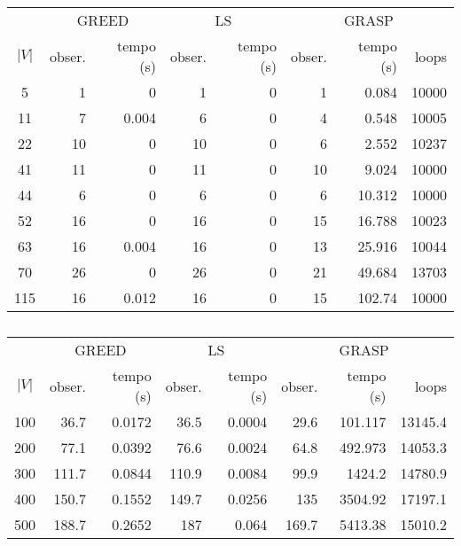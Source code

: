 \documentclass[]{article}
\title{}
\author{}
\begin{document}
\maketitle

\begin {table}[h]
\centering
\caption{}
\begin{small}
\begin{tabular}{|c|r|r|r|r|r|r|r|}
\hline
          & \multicolumn{2}{c|}{GREED} & \multicolumn{2}{c|}{LS} & \multicolumn{3}{c|}{GRASP} \\ 
\cline{2-8}
  $|V|$   &  obser. & tempo (s)  & obser. & tempo (s) & obser. & tempo (s) & loops\\ 
\hline
5 & 1 & 0 & 1 & 0 & 1 & 0.084 & 10000 \\ 
11 & 7 & 0.004 & 6 & 0 & 4 & 0.548 & 10005 \\ 
22 & 10 & 0 & 10 & 0 & 6 & 2.552 & 10237 \\ 
41 & 11 & 0 & 11 & 0 & 10 & 9.024 & 10000 \\ 
44 & 6 & 0 & 6 & 0 & 6 & 10.312 & 10000 \\ 
52 & 16 & 0 & 16 & 0 & 15 & 16.788 & 10023 \\ 
63 & 16 & 0.004 & 16 & 0 & 13 & 25.916 & 10044 \\ 
70 & 26 & 0 & 26 & 0 & 21 & 49.684 & 13703 \\ 
115 & 16 & 0.012 & 16 & 0 & 15 & 102.74 & 10000 \\ 
\hline
\end{tabular} \label{}
\end{small}
\end{table}

\begin {table}[h]
\centering
\caption{}
\begin{small}
\begin{tabular}{|c|r|r|r|r|r|r|r|}
\hline
          & \multicolumn{2}{c|}{GREED} & \multicolumn{2}{c|}{LS} & \multicolumn{3}{c|}{GRASP} \\ 
\cline{2-8}
  $|V|$   &  obser. & tempo (s)  & obser. & tempo (s) & obser. & tempo (s) & loops\\ 
\hline
100 & 36.7 & 0.0172 & 36.5 & 0.0004 & 29.6 & 101.117 & 13145.4 \\ 
200 & 77.1 & 0.0392 & 76.6 & 0.0024 & 64.8 & 492.973 & 14053.3 \\ 
300 & 111.7 & 0.0844 & 110.9 & 0.0084 & 99.9 & 1424.2 & 14780.9 \\ 
400 & 150.7 & 0.1552 & 149.7 & 0.0256 & 135 & 3504.92 & 17197.1 \\ 
500 & 188.7 & 0.2652 & 187 & 0.064 & 169.7 & 5413.38 & 15010.2 \\ 
\hline
\end{tabular} \label{}
\end{small}
\end{table}
\end{document}
